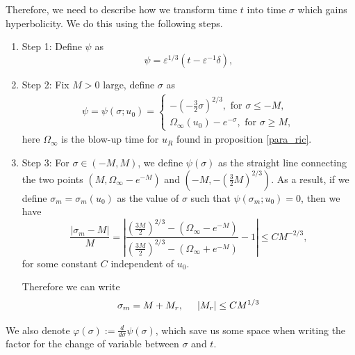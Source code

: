 \documentclass[letterpaper,11pt]{article}
\newcommand{\eps}{\varepsilon}
\numberwithin{equation}{section}
\theoremstyle{plain}
\begin{document}
Therefore, we need to describe how we transform time $t$ into time $\sigma$ which gains hyperbolicity. We do this using the following steps.
\begin{enumerate}
\item Step 1: Define $\psi$ as
\[
\psi = \eps^{1/3}(t - \eps^{-1}\delta),
\]

\item Step 2:
Fix $M>0$ large, define $\sigma$ as
\begin{align*}
\psi = \psi(\sigma; u_0) =\begin{cases}
-(-\frac{3}{2} \sigma)^{2/3} , \text{ for }\sigma \le -M, \\
\Omega_\infty(u_0) -e^{-\sigma}, \text{ for }\sigma \ge M,
\end{cases}
\end{align*}
here $\Omega_\infty$ is the blow-up time for $u_R$ found in proposition \ref{para_ric}.

\item Step 3: For $\sigma \in (-M, M)$, we define $\psi(\sigma)$ as the straight line connecting the two points $(M, \Omega_\infty-e^{-M})$ and $(-M, -(\frac{3}{2}M)^{2/3})$. As a result, if we define $\sigma_m=\sigma_m(u_0)$ as the value of $\sigma$ such that $\psi(\sigma_m; u_0) = 0$, then we have 
\[
\frac{|\sigma_m - M|}{M} = \left| \frac{(\frac{3M}{2})^{2/3}-(\Omega_\infty-e^{-M})}{(\frac{3M}{2})^{2/3}-(\Omega_\infty+e^{-M})} -1 \right|\le CM^{-2/3},
\] 
for some constant $C$ independent of $u_0$.

Therefore we can write
\begin{equation}\label{sigm_asy}
\sigma_m = M + M_r, \hspace{0.2in} |M_r| \le CM^{1/3}
\end{equation}
\end{enumerate}


We also denote $\varphi(\sigma) := \frac{d}{d\sigma}\psi(\sigma)$, which save us some space when writing the factor for the change of variable between $\sigma $ and $t$. 
\end{document}
